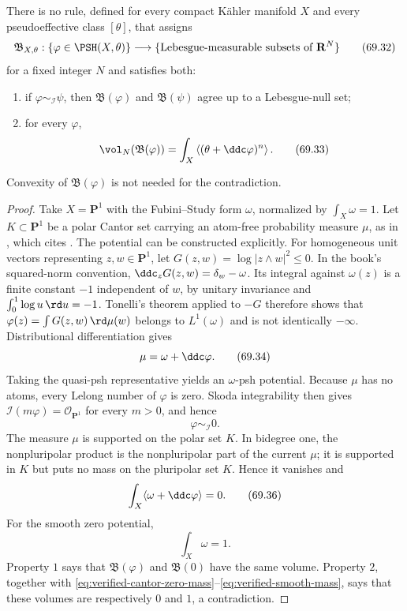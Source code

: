 \begin{theorem}\label{thm:verified-mass-no-go}
There is no rule, defined for every compact K\"ahler manifold $X$
and every pseudoeffective class $[\theta]$, that assigns
\[
 \mathfrak B_{X,\theta}:
 \{\varphi\in\PSH(X,\theta)\}
       \longrightarrow
 \{\text{Lebesgue-measurable subsets of }\mathbf R^N\}
\tag{69.32}\label{eq:verified-body-assignment}
\]
for a fixed integer $N$ and satisfies both:
\begin{enumerate}
\item if $\varphi\sim_{\mathcal I}\psi$, then
      $\mathfrak B(\varphi)$ and $\mathfrak B(\psi)$ agree up to
      a Lebesgue-null set;
\item for every $\varphi$,
      \[
          \vol_N(\mathfrak B(\varphi))
             =\int_X\left\langle
                    (\theta+\ddc\varphi)^n
                       \right\rangle.
      \tag{69.33}\label{eq:verified-body-mass}
      \]
\end{enumerate}
Convexity of $\mathfrak B(\varphi)$ is not needed for the
contradiction.
\end{theorem}

\begin{proof}
Take $X=\mathbf P^1$ with the Fubini--Study form $\omega$,
normalized by $\int_X\omega=1$. Let $K\subset\mathbf P^1$ be a
polar Cantor set carrying an atom-free probability measure $\mu$, as
in \cite[Example~6.1.3]{XiaBook}, which cites \cite[p.~31]{Car83}.
The potential can be constructed explicitly. For homogeneous unit vectors
representing $z,w\in\mathbf P^1$, let
$G(z,w)=\log|z\wedge w|^2\leq0$. In the book's squared-norm convention,
$\ddc_zG(z,w)=\delta_w-\omega$. Its integral against $\omega(z)$ is a
finite constant $-1$ independent of $w$, by unitary invariance and
$\int_0^1\log u\,\rd u=-1$. Tonelli's
theorem applied to $-G$ therefore shows that
$\varphi(z)=\int G(z,w)\,\rd\mu(w)$ belongs to $L^1(\omega)$ and is not
identically $-\infty$. Distributional differentiation gives
\[
                           \mu=\omega+\ddc\varphi.
\tag{69.34}\label{eq:verified-cantor-potential}
\]
Taking the quasi-psh representative yields an $\omega$-psh potential.
Because $\mu$ has no atoms, every Lelong number of $\varphi$ is
zero. Skoda integrability then gives
$\mathcal I(m\varphi)=\mathcal O_{\mathbf P^1}$ for every
$m>0$, and hence
\[
                              \varphi\sim_{\mathcal I}0.
\tag{69.35}\label{eq:verified-cantor-i-equivalence}
\]
The measure $\mu$ is supported on the polar set $K$. In bidegree
one, the nonpluripolar product is the nonpluripolar part of the current
$\mu$; it is supported in $K$ but puts no mass on the pluripolar
set $K$. Hence it vanishes and
\[
               \int_X\langle\omega+\ddc\varphi\rangle=0.
\tag{69.36}\label{eq:verified-cantor-zero-mass}
\]
For the smooth zero potential,
\[
                              \int_X\omega=1.
\tag{69.37}\label{eq:verified-smooth-mass}
\]
Property $1$ says that
$\mathfrak B(\varphi)$ and $\mathfrak B(0)$ have the same volume.
Property $2$, together with
\eqref{eq:verified-cantor-zero-mass}--\eqref{eq:verified-smooth-mass},
says that these volumes are respectively $0$ and $1$, a
contradiction.
\end{proof}

